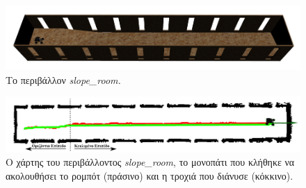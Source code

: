 \begin{figure}[!ht]
	\centering
	\includegraphics[width=\linewidth]{Chapters/Chapter5/Figures/ptc_experiments/slope_room.png}
	\caption{Το περιβάλλον \textit{slope{\_}room.}}
	\label{fig:slope_room}
\end{figure}	
	
\begin{figure}[!ht]
	\centering
	\includegraphics[width=\linewidth]{Chapters/Chapter5/Figures/ptc_experiments/slope_room_path_and_traj.png}
	\caption{Ο χάρτης του περιβάλλοντος \textit{slope{\_}room}, το μονοπάτι που κλήθηκε να ακολουθήσει το ρομπότ (πράσινο) και η τροχιά που διάνυσε (κόκκινο).}
	\label{fig:slope_room_room_path_and_traj}
\end{figure}

